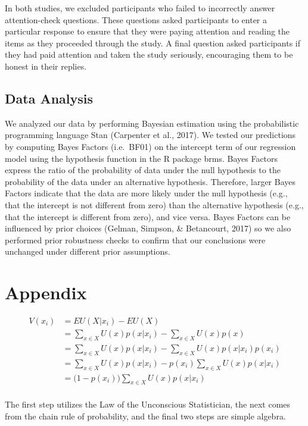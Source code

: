 \documentclass[]{article}
\begin{document}
In both studies, we excluded participants who failed to incorrectly
answer attention-check questions. These questions asked participants to
enter a particular response to ensure that they were paying attention
and reading the items as they proceeded through the study. A final
question asked participants if they had paid attention and taken the
study seriously, encouraging them to be honest in their replies.

\subsection{Data Analysis}\label{data-analysis}

We analyzed our data by performing Bayesian estimation using the
probabilistic programming language Stan (Carpenter et al., 2017). We
tested our predictions by computing Bayes Factors (i.e.~BF01) on the
intercept term of our regression model using the hypothesis function in
the R package brms. Bayes Factors express the ratio of the probability
of data under the null hypothesis to the probability of the data under
an alternative hypothesis. Therefore, larger Bayes Factors indicate that
the data are more likely under the null hypothesis (e.g., that the
intercept is not different from zero) than the alternative hypothesis
(e.g., that the intercept is different from zero), and vice versa. Bayes
Factors can be influenced by prior choices (Gelman, Simpson, \&
Betancourt, 2017) so we also performed prior robustness checks to
confirm that our conclusions were unchanged under different prior
assumptions.

\section{Appendix}\label{appendix}

\[ \begin{aligned}
V(x_i) &= EU(X|x_i) - EU(X) \\
&=  \sum_{x \in X} U(x)p(x|x_i) - \sum_{x \in X} U(x)p(x) \\
&= \sum_{x \in X} U(x)p(x|x_i) - \sum_{x \in X} U(x)p(x|x_i)p(x_i) \\
&= \sum_{x \in X} U(x)p(x|x_i) - p(x_i)\sum_{x \in X} U(x)p(x|x_i) \\
&= \big(1 - p(x_i) \big) \sum_{x \in X} U(x)p(x|x_i) \\
\end{aligned}\]

The first step utilizes the Law of the Unconscious Statistician, the
next comes from the chain rule of probability, and the final two steps
are simple algebra.
\end{document}
